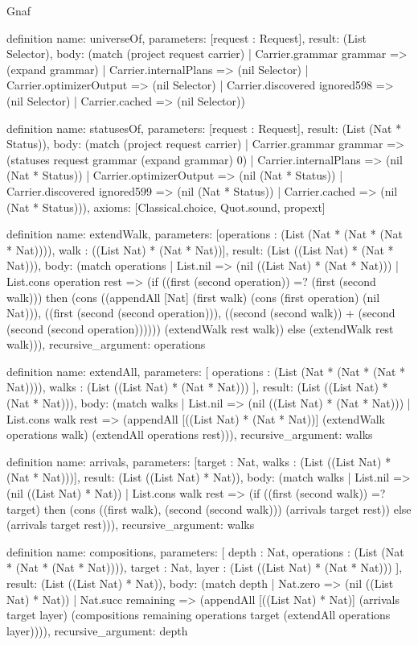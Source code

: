\begin{lexlean}{Gnaf}
\begin{semanticmodule}
definition{
  name: universeOf,
  parameters: [request : Request],
  result: (List Selector),
  body: (match (project request carrier)
    | Carrier.grammar grammar => (expand grammar)
    | Carrier.internalPlans => (nil Selector)
    | Carrier.optimizerOutput => (nil Selector)
    | Carrier.discovered ignored598 => (nil Selector)
    | Carrier.cached => (nil Selector))
}

definition{
  name: statusesOf,
  parameters: [request : Request],
  result: (List (Nat * Status)),
  body: (match (project request carrier)
    | Carrier.grammar grammar => (statuses request grammar (expand grammar) 0)
    | Carrier.internalPlans => (nil (Nat * Status))
    | Carrier.optimizerOutput => (nil (Nat * Status))
    | Carrier.discovered ignored599 => (nil (Nat * Status))
    | Carrier.cached => (nil (Nat * Status))),
  axioms: [Classical.choice, Quot.sound, propext]
}

definition{
  name: extendWalk,
  parameters: [operations : (List (Nat * (Nat * (Nat * Nat)))), walk : ((List Nat) * (Nat * Nat))],
  result: (List ((List Nat) * (Nat * Nat))),
  body: (match operations
    | List.nil => (nil ((List Nat) * (Nat * Nat)))
    | List.cons operation rest => (if ((first (second operation)) =? (first (second walk))) then (cons ((appendAll [Nat] (first walk) (cons (first operation) (nil Nat))), ((first (second (second operation))), ((second (second walk)) + (second (second (second operation)))))) (extendWalk rest walk)) else (extendWalk rest walk))),
  recursive_argument: operations
}

definition{
  name: extendAll,
  parameters: [
    operations : (List (Nat * (Nat * (Nat * Nat)))),
    walks : (List ((List Nat) * (Nat * Nat)))
  ],
  result: (List ((List Nat) * (Nat * Nat))),
  body: (match walks
    | List.nil => (nil ((List Nat) * (Nat * Nat)))
    | List.cons walk rest => (appendAll [((List Nat) * (Nat * Nat))] (extendWalk operations walk) (extendAll operations rest))),
  recursive_argument: walks
}

definition{
  name: arrivals,
  parameters: [target : Nat, walks : (List ((List Nat) * (Nat * Nat)))],
  result: (List ((List Nat) * Nat)),
  body: (match walks
    | List.nil => (nil ((List Nat) * Nat))
    | List.cons walk rest => (if ((first (second walk)) =? target) then (cons ((first walk), (second (second walk))) (arrivals target rest)) else (arrivals target rest))),
  recursive_argument: walks
}

definition{
  name: compositions,
  parameters: [
    depth : Nat,
    operations : (List (Nat * (Nat * (Nat * Nat)))),
    target : Nat,
    layer : (List ((List Nat) * (Nat * Nat)))
  ],
  result: (List ((List Nat) * Nat)),
  body: (match depth
    | Nat.zero => (nil ((List Nat) * Nat))
    | Nat.succ remaining => (appendAll [((List Nat) * Nat)] (arrivals target layer) (compositions remaining operations target (extendAll operations layer)))),
  recursive_argument: depth
}


\end{semanticmodule}
\end{lexlean}

